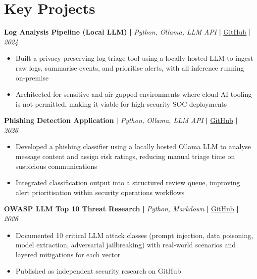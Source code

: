 \documentclass[letterpaper,11pt]{article}
\begin{document}
\section{Key Projects}

\noindent
\textbf{Log Analysis Pipeline (Local LLM)} \textbf{|} \textit{Python, Ollama, LLM API} \textbf{|}
\href{https://github.com/leslieniiadjetey}{GitHub} \textbf{|} \textit{2024}

\begin{itemize}
  \item Built a privacy-preserving log triage tool using a locally hosted LLM to ingest raw logs,
        summarise events, and prioritise alerts, with all inference running on-premise
  \item Architected for sensitive and air-gapped environments where cloud AI tooling is not permitted,
        making it viable for high-security SOC deployments
\end{itemize}

\noindent
\textbf{Phishing Detection Application} \textbf{|} \textit{Python, Ollama, LLM API} \textbf{|}
\href{https://github.com/leslieniiadjetey}{GitHub} \textbf{|} \textit{2026}

\begin{itemize}
  \item Developed a phishing classifier using a locally hosted Ollama LLM to analyse message content
        and assign risk ratings, reducing manual triage time on suspicious communications
  \item Integrated classification output into a structured review queue, improving alert prioritisation
        within security operations workflows
\end{itemize}

\noindent
\textbf{OWASP LLM Top 10 Threat Research} \textbf{|} \textit{Python, Markdown} \textbf{|}
\href{https://github.com/leslieniiadjetey}{GitHub} \textbf{|} \textit{2026}

\begin{itemize}
  \item Documented 10 critical LLM attack classes (prompt injection, data poisoning, model extraction,
        adversarial jailbreaking) with real-world scenarios and layered mitigations for each vector
  \item Published as independent security research on GitHub
\end{itemize}

\end{document}
